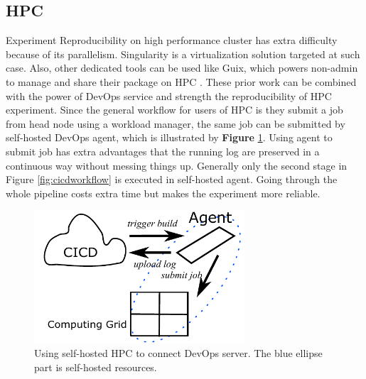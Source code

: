 \documentclass{IEEEcsmag}
\begin{document}
\subsection{HPC}
Experiment Reproducibility on high performance cluster has extra difficulty because of its parallelism. Singularity is a virtualization solution targeted at such case. %
Also, other dedicated tools can be used like Guix, which powers non-admin to manage and share their package on HPC \cite{courtes2015reproducible}. These prior work can be combined with the power of DevOps service and strength the reproducibility of HPC experiment. Since the general workflow for users of HPC is they submit a job from head node using a workload manager, the same job can be submitted by self-hosted DevOps agent, which is illustrated by {\bf Figure} \ref{fig:selfhosted}. Using agent to submit job has extra advantages that the running log are preserved in a continuous way without messing things up. Generally only the second stage in Figure \ref{fig:cicdworkflow}
is executed in self-hosted agent. Going through the whole pipeline costs extra time but makes the experiment more reliable.

\begin{figure}[!ht]
\centerline{\includegraphics[width=18.5pc]{self-hosted.pdf}}
\caption{Using self-hosted HPC to connect DevOps server. The blue ellipse part is self-hosted resources.}\label{fig:selfhosted}
\end{figure}
\end{document}
